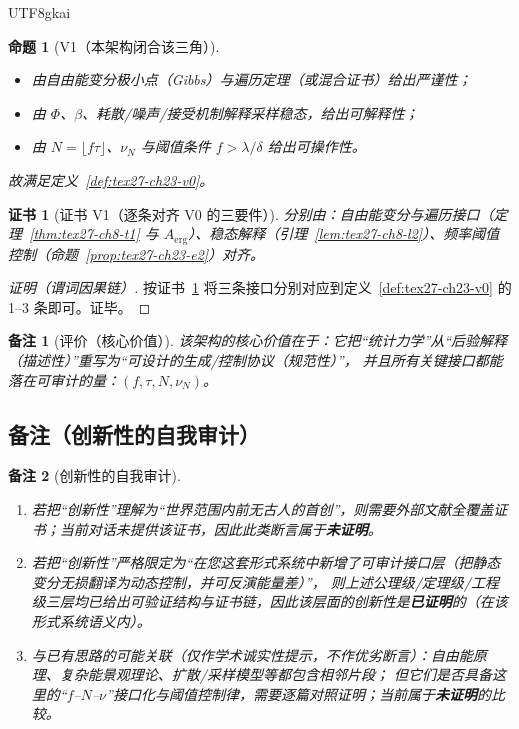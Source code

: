 \documentclass[12pt]{article}
\newtheorem{proposition}{命题}[section]
\newtheorem{remark}{备注}[section]
\newtheorem{Certificate}{证书}[section]
\begin{document}
\begin{CJK*}{UTF8}{gkai}
\begin{proposition}[V1（本架构闭合该三角）]
\label{prop:tex27-ch23-v1}
\begin{itemize}
  \item 由自由能变分极小点（Gibbs）与遍历定理（或混合证书）给出严谨性；
  \item 由 $\Phi$、$\beta$、耗散/噪声/接受机制解释采样稳态，给出可解释性；
  \item 由 $N=\lfloor f\tau\rfloor$、$\nu_N$ 与阈值条件 $f>\lambda/\delta$ 给出可操作性。
\end{itemize}
故满足定义~\ref{def:tex27-ch23-v0}。
\end{proposition}

\begin{Certificate}[证书 V1（逐条对齐 V0 的三要件）]
\label{cert:tex27-ch23-v1}
分别由：自由能变分与遍历接口（定理~\ref{thm:tex27-ch8-t1} 与 $A_{\mathrm{erg}}$）、稳态解释（引理~\ref{lem:tex27-ch8-l2}）、频率阈值控制（命题~\ref{prop:tex27-ch23-e2}）对齐。
\end{Certificate}

\begin{proof}[证明（谓词因果链）]
按证书~\ref{cert:tex27-ch23-v1} 将三条接口分别对应到定义~\ref{def:tex27-ch23-v0} 的 1--3 条即可。证毕。
\end{proof}

\begin{remark}[评价（核心价值）]
\label{rem:tex27-ch23-core-eval}
该架构的核心价值在于：它把“统计力学”从“后验解释（描述性）”重写为“可设计的生成/控制协议（规范性）”，
并且所有关键接口都能落在可审计的量：$(f,\tau,N,\nu_N)$。
\end{remark}

\subsection{备注（创新性的自我审计）}
\label{subsec:tex27-ch23-self-audit}

\begin{remark}[创新性的自我审计]
\label{rem:tex27-ch23-self-audit}
\begin{enumerate}
  \item 若把“创新性”理解为“世界范围内前无古人的首创”，则需要外部文献全覆盖证书；当前对话未提供该证书，因此此类断言属于\textbf{未证明}。
  \item 若把“创新性”严格限定为“在您这套形式系统中新增了可审计接口层（把静态变分无损翻译为动态控制，并可反演能量差）”，
  则上述公理级/定理级/工程级三层均已给出可验证结构与证书链，因此该层面的创新性是\textbf{已证明}的（在该形式系统语义内）。
  \item 与已有思路的可能关联（仅作学术诚实性提示，不作优劣断言）：自由能原理、复杂能景观理论、扩散/采样模型等都包含相邻片段；
  但它们是否具备这里的“$f$--$N$--$\nu$”接口化与阈值控制律，需要逐篇对照证明；当前属于\textbf{未证明}的比较。
\end{enumerate}
\end{remark}


\end{CJK*}
\end{document}
